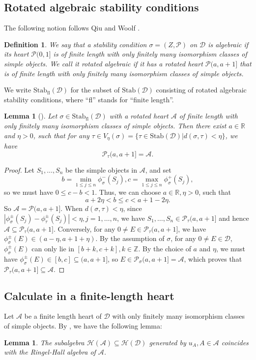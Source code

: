 \documentclass[a4paper,12pt]{amsart}
\numberwithin{equation}{section}
\newtheorem{definition}[theorem]{Definition}
\newtheorem{lemma}[theorem]{Lemma}
\newcommand{\Stab}{\mathrm{Stab}}
\newcommand{\1}{\mathbf{1}}
\newcommand{\fl}{\mathrm{fl}}
\begin{document}
\subsection{Rotated algebraic stability conditions}
The following notion follows Qiu and Woolf \cite{QW2018}.
\begin{definition}
    We say that a stability condition $\sigma=(Z,\mathcal{P})$ on $\mathcal{D}$ is \emph{algebraic} if its heart $\mathcal{P}(0,1]$ is of finite length with only finitely many isomorphism classes of simple objects. We call it \emph{rotated algebraic} if it has a rotated heart $\mathcal{P}(a,a+1]$ that is of finite length with only finitely many isomorphism classes of simple objects.
\end{definition}
We write $\Stab_\fl(\mathcal{D})$ for the subset of $\Stab(\mathcal{D})$ consisting of rotated algebraic stability conditions, where ``fl'' stands for ``finite length''.
\begin{lemma}[{\cite[Lemma 3.1; Lemma 3.11]{QW2018}}]\label{fl neighbourhood}
    Let $\sigma\in\Stab_\fl(\mathcal{D})$ with a rotated heart $\mathcal{A}$ of finite length with only finitely many isomorphism classes of simple objects. Then there exist  $a\in\mathbb{R}$ and $\eta>0$, such that for any $\tau\in V_\eta(\sigma)=\{\tau\in\Stab(\mathcal{D})|d(\sigma,\tau)<\eta\}$, we have
    \[\mathcal{P}_\tau(a,a+1]=\mathcal{A}.\]
\end{lemma}
\begin{proof}
    Let $S_1,\dots,S_n$ be the simple objects in $\mathcal{A}$, and set
    \[b=\min_{1\leqslant j\leqslant n}\phi_\sigma^-(S_j),c=\max_{1\leqslant j\leqslant n}\phi_\sigma^+(S_j),\]
    so we must have $0\leqslant c-b<1$. Thus, we can choose $a\in\mathbb{R},\eta>0$, such that
    \[a+2\eta<b\leqslant c<a+1-2\eta.\]
    So $\mathcal{A}=\mathcal{P}(a,a+1]$. When $d(\sigma,\tau)<\eta$, since $|\phi_\sigma^\pm(S_j)-\phi_\tau^\pm(S_j)|<\eta,j=1,\dots,n$, we have $S_1,\dots,S_n\in\mathcal{P}_\tau(a,a+1]$ and hence $\mathcal{A}\subseteq\mathcal{P}_\tau(a,a+1]$. Conversely, for any $0\neq E\in\mathcal{P}_\tau(a,a+1]$, we have $\phi_\sigma^\pm(E)\in(a-\eta,a+1+\eta)$. By the assumption of $\sigma$, for any $0\neq E\in\mathcal{D}$, $\phi_\sigma^\pm(E)$ can only lie in $[b+k,c+k],k\in\mathbb{Z}$. By the choice of $a$ and $\eta$, we must have $\phi_\sigma^\pm(E)\in[b,c]\subseteq(a,a+1]$, so $E\in\mathcal{P}_\sigma(a,a+1]=\mathcal{A}$, which proves that $\mathcal{P}_\tau(a,a+1]\subseteq\mathcal{A}.$
\end{proof}
\subsection{Calculate in a finite-length heart}
Let $\mathcal{A}$ be a finite length heart of $\mathcal{D}$ with only finitely many isomorphism classes of simple objects. By \cite[Proposition 6.1]{Toe2006}, we have the following lemma:
\begin{lemma}
    The subalgebra $\mathcal{H}(\mathcal{A})\subseteq\mathcal{H}(\mathcal{D})$ generated by $u_A,A\in\mathcal{A}$ coincides with the Ringel-Hall algebra of $\mathcal{A}$.
\end{lemma}
\end{document}
